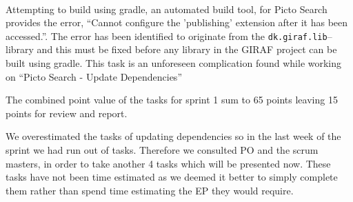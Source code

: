 \begin{description}[style=unboxed]
    \item[{[}\pblocking{]} Gradle - Custom plug-in dk.giraf.lib for gradle breaks build] \hfill \\
        Attempting to build using gradle, an automated build tool, for Picto Search provides the error, ``Cannot configure the 'publishing' extension after it has been accessed.''. 
        The error has been identified to originate from the \texttt{dk.giraf.lib}--library and this must be fixed before any library in the GIRAF project can be built using gradle. 
        This task is an unforeseen complication found while working on ``Picto Search - Update Dependencies''
\end{description}
The combined point value of the tasks for sprint 1 sum to 65 points leaving 15 points for review and report.

We overestimated the tasks of updating dependencies so in the last week of the sprint we had run out of tasks.
Therefore we consulted PO and the scrum masters, in order to take another 4 tasks which will be presented now.
These tasks have not been time estimated as we deemed it better to simply complete them rather than spend time estimating the EP they would require.

